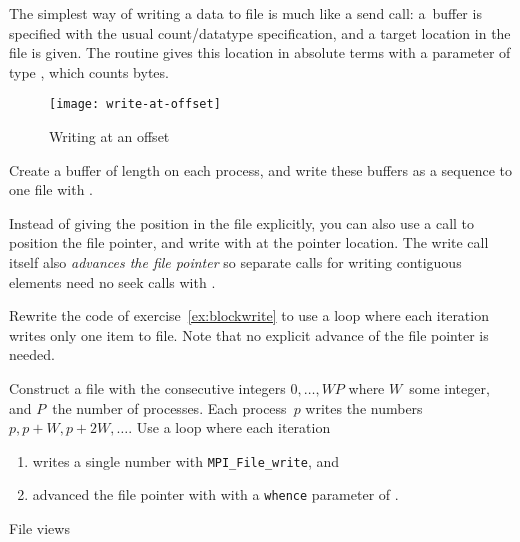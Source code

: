 The simplest way of writing a data to file is much like a send call:
a~buffer is specified with the usual count/datatype specification,
and a target location in the file is given.
The routine  gives this location
in absolute terms with a parameter of type ,
which counts bytes.

\begin{figure}[ht]
  \label{fig:write-at}
  \caption{Writing at an offset}
  \texttt{[image: write-at-offset]}
\end{figure}

\begin{exercise}
  \label{ex:blockwrite}
  Create a buffer of length  on each process, and write
  these buffers as a sequence to one file with .
\end{exercise}

Instead of giving the position in the file explicitly, you can also
use a  call to position the file pointer,
and write with  at the pointer location.
The write call itself also 
\emph{advances the file pointer}
so separate calls for writing contiguous elements 
need no seek calls with .

\begin{exercise}
  \label{ex:blockadvance}
  Rewrite the code of exercise~\ref{ex:blockwrite} to
  use a loop where each iteration
  writes only one item to file.
  Note that no explicit advance of the file pointer is needed.
\end{exercise}

\begin{exercise}
  \label{ex:blockseek}
  Construct a file with the consecutive integers $0,\ldots,WP$ where
  $W$~some integer, and $P$~the number of processes. Each process~$p$
  writes the numbers $p,p+W,p+2W,\ldots$. Use a loop where each iteration
  \begin{enumerate}
  \item writes a single number with \lstinline{MPI_File_write}, and
  \item advanced the file pointer with 
    with a \lstinline{whence} parameter of
    .
  \end{enumerate}
\end{exercise}

 {File views}

